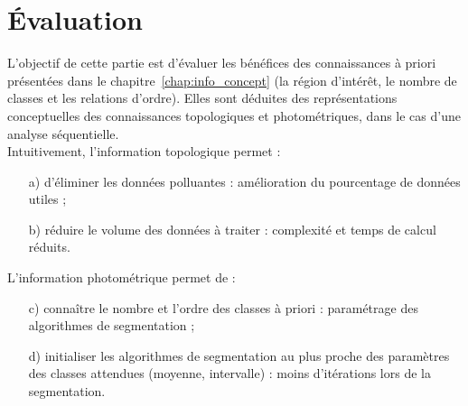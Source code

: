 

	
\chapter{Évaluation}
\label{sec:eval}
	L'objectif de cette partie est d'évaluer les bénéfices des connaissances à priori présentées dans le chapitre~\ref{chap:info_concept} (la région d'intérêt, le nombre de classes et les relations d'ordre). Elles sont déduites des représentations conceptuelles des connaissances topologiques et photométriques, dans le cas d'une analyse séquentielle.\\

Intuitivement, l'information topologique permet :


\begin{itemize}
	\item[a)] d'éliminer les données polluantes : amélioration du pourcentage de données utiles ;
	\item[b)] réduire le volume des données à traiter : complexité et temps de calcul réduits.
\end{itemize}

L'information photométrique permet de :

\begin{itemize}
	\item[c)] connaître le nombre et l'ordre des classes à priori : paramétrage des algorithmes de segmentation ;
	\item[d)] initialiser les algorithmes de segmentation au plus proche des paramètres des classes attendues (moyenne, intervalle) : moins d'itérations lors de la segmentation.
\end{itemize}\vspace{1em}

